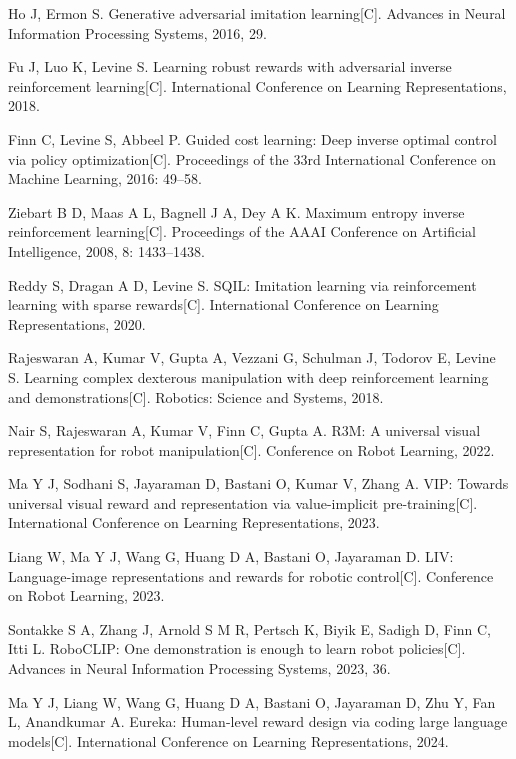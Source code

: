 Ho J, Ermon S.
Generative adversarial imitation learning[C].
Advances in Neural Information Processing Systems, 2016, 29.

Fu J, Luo K, Levine S.
Learning robust rewards with adversarial inverse reinforcement learning[C].
International Conference on Learning Representations, 2018.

Finn C, Levine S, Abbeel P.
Guided cost learning: Deep inverse optimal control via policy optimization[C].
Proceedings of the 33rd International Conference on Machine Learning, 2016: 49--58.

Ziebart B D, Maas A L, Bagnell J A, Dey A K.
Maximum entropy inverse reinforcement learning[C].
Proceedings of the AAAI Conference on Artificial Intelligence, 2008, 8: 1433--1438.

Reddy S, Dragan A D, Levine S.
SQIL: Imitation learning via reinforcement learning with sparse rewards[C].
International Conference on Learning Representations, 2020.

Rajeswaran A, Kumar V, Gupta A, Vezzani G, Schulman J, Todorov E, Levine S.
Learning complex dexterous manipulation with deep reinforcement learning and demonstrations[C].
Robotics: Science and Systems, 2018.

Nair S, Rajeswaran A, Kumar V, Finn C, Gupta A.
R3M: A universal visual representation for robot manipulation[C].
Conference on Robot Learning, 2022.

Ma Y J, Sodhani S, Jayaraman D, Bastani O, Kumar V, Zhang A.
VIP: Towards universal visual reward and representation via value-implicit pre-training[C].
International Conference on Learning Representations, 2023.

Liang W, Ma Y J, Wang G, Huang D A, Bastani O, Jayaraman D.
LIV: Language-image representations and rewards for robotic control[C].
Conference on Robot Learning, 2023.

Sontakke S A, Zhang J, Arnold S M R, Pertsch K, Biyik E, Sadigh D, Finn C, Itti L.
RoboCLIP: One demonstration is enough to learn robot policies[C].
Advances in Neural Information Processing Systems, 2023, 36.

Ma Y J, Liang W, Wang G, Huang D A, Bastani O, Jayaraman D, Zhu Y, Fan L, Anandkumar A.
Eureka: Human-level reward design via coding large language models[C].
International Conference on Learning Representations, 2024.

